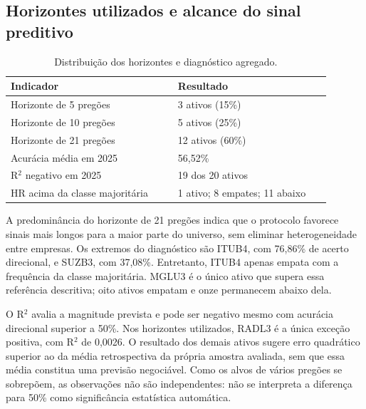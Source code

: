 \subsection*{Horizontes utilizados e alcance do sinal preditivo}
\begin{table}[H]
\centering
\caption{Distribuição dos horizontes e diagnóstico agregado.}
\label{tab:diagnostico_pool}
{\footnotesize
\begin{tabular}{@{}p{0.47\linewidth}p{0.43\linewidth}@{}}
\hline
Indicador & Resultado \\ \hline
Horizonte de 5 pregões & 3 ativos (15\%) \\
Horizonte de 10 pregões & 5 ativos (25\%) \\
Horizonte de 21 pregões & 12 ativos (60\%) \\
Acurácia média em 2025 & 56,52\% \\
R$^{2}$ negativo em 2025 & 19 dos 20 ativos \\
HR acima da classe majoritária & 1 ativo; 8 empates; 11 abaixo \\
\hline
\end{tabular}}
\par{}
\end{table}
A predominância do horizonte de 21 pregões indica que o protocolo favorece sinais mais longos para a maior parte do universo, sem eliminar heterogeneidade entre empresas. Os extremos do diagnóstico são ITUB4, com 76,86\% de acerto direcional, e SUZB3, com 37,08\%. Entretanto, ITUB4 apenas empata com a frequência da classe majoritária. MGLU3 é o único ativo que supera essa referência descritiva; oito ativos empatam e onze permanecem abaixo dela.

O R$^{2}$ avalia a magnitude prevista e pode ser negativo mesmo com acurácia direcional superior a 50\%. Nos horizontes utilizados, RADL3 é a única exceção positiva, com R$^{2}$ de 0,0026. O resultado dos demais ativos sugere erro quadrático superior ao da média retrospectiva da própria amostra avaliada, sem que essa média constitua uma previsão negociável. Como os alvos de vários pregões se sobrepõem, as observações não são independentes: não se interpreta a diferença para 50\% como significância estatística automática.

